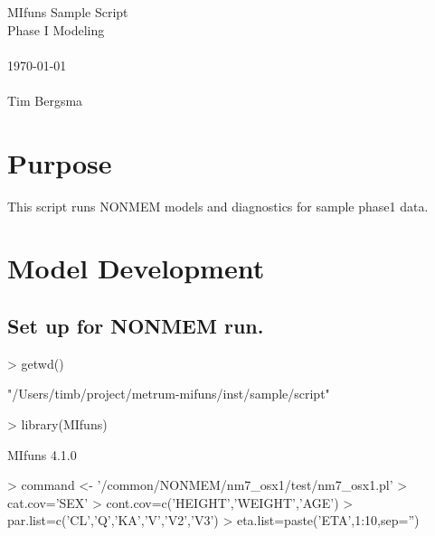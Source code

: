 
\usepackage{Sweave}

 

\vspace*{2cm}
\begin{center}
{\Large MIfuns Sample Script}\\
\vspace{1.5cm}
{\Large Phase I Modeling}\\
~\\
\today\\
~\\
Tim Bergsma\\
\end{center}
\newpage

\section{Purpose}
This script runs NONMEM models and diagnostics for sample phase1 data.
\section{Model Development}
\subsection{Set up for NONMEM run.}
\begin{Schunk}
\begin{Sinput}
> getwd()
\end{Sinput}
\begin{Soutput}
[1] "/Users/timb/project/metrum-mifuns/inst/sample/script"
\end{Soutput}
\begin{Sinput}
> library(MIfuns)
\end{Sinput}
\begin{Soutput}
MIfuns 4.1.0 
\end{Soutput}
\begin{Sinput}
> command <- '/common/NONMEM/nm7_osx1/test/nm7_osx1.pl'
> cat.cov='SEX'
> cont.cov=c('HEIGHT','WEIGHT','AGE')
> par.list=c('CL','Q','KA','V','V2','V3')
> eta.list=paste('ETA',1:10,sep='')
\end{Sinput}
\end{Schunk}
